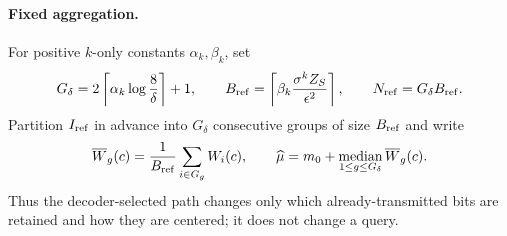\paragraph{Fixed aggregation.}
For positive $k$-only constants $\alpha_k,\beta_k$, set
\[
G_\delta=2\left\lceil\alpha_k\log\frac8\delta\right\rceil+1,
\qquad
B_{\rm ref}=\left\lceil\beta_k\frac{\sigma^kZ_S}{\epsilon^2}\right\rceil,
\qquad N_{\rm ref}=G_\delta B_{\rm ref}.
\]
Partition $I_{\rm ref}$ in advance into $G_\delta$ consecutive groups of
size $B_{\rm ref}$ and write
\[
\overline W_g(c)=\frac1{B_{\rm ref}}\sum_{i\in G_g}W_i(c),
\qquad
\widehat\mu=m_0+\mathop{\rm median}_{1\leq g\leq G_\delta}
  \overline W_g(c).
\]
Thus the decoder-selected path changes only which already-transmitted bits are
retained and how they are centered; it does not change a query.
